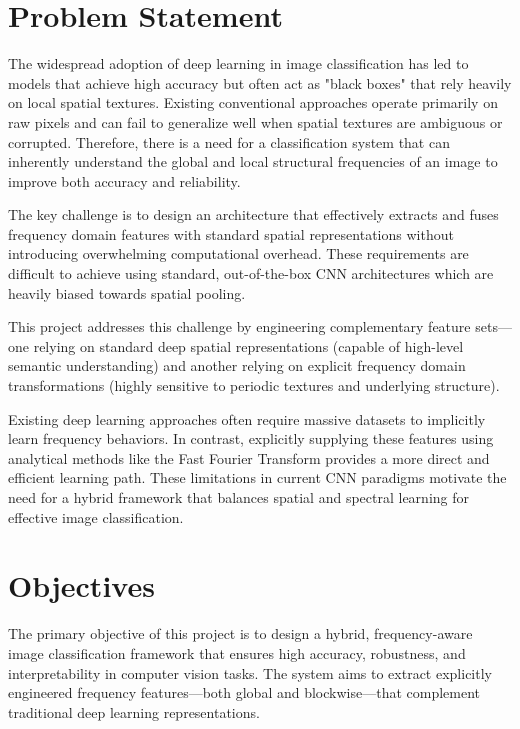 \section{Problem Statement}

The widespread adoption of deep learning in image classification has led to models that achieve high accuracy but often act as "black boxes" that rely heavily on local spatial textures. Existing conventional approaches operate primarily on raw pixels and can fail to generalize well when spatial textures are ambiguous or corrupted. Therefore, there is a need for a classification system that can inherently understand the global and local structural frequencies of an image to improve both accuracy and reliability.

The key challenge is to design an architecture that effectively extracts and fuses frequency domain features with standard spatial representations without introducing overwhelming computational overhead. These requirements are difficult to achieve using standard, out-of-the-box CNN architectures which are heavily biased towards spatial pooling.

This project addresses this challenge by engineering complementary feature sets—one relying on standard deep spatial representations (capable of high-level semantic understanding) and another relying on explicit frequency domain transformations (highly sensitive to periodic textures and underlying structure).

Existing deep learning approaches often require massive datasets to implicitly learn frequency behaviors. In contrast, explicitly supplying these features using analytical methods like the Fast Fourier Transform provides a more direct and efficient learning path. These limitations in current CNN paradigms motivate the need for a hybrid framework that balances spatial and spectral learning for effective image classification.

\section{Objectives}

The primary objective of this project is to design a hybrid, frequency-aware image classification framework that ensures high accuracy, robustness, and interpretability in computer vision tasks. The system aims to extract explicitly engineered frequency features—both global and blockwise—that complement traditional deep learning representations. 

